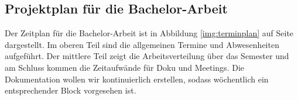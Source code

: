 
\subsection{Projektplan für die Bachelor-Arbeit}
Der Zeitplan für die Bachelor-Arbeit ist in Abbildung \ref{img:terminplan} auf Seite \pageref{img:terminplan} dargestellt.
Im oberen Teil sind die allgemeinen Termine und Abwesenheiten aufgeführt. Der mittlere Teil zeigt die Arbeitsverteilung über das Semester und am Schluss kommen die Zeitaufwände für Doku und Meetings. Die Dokumentation wollen wir kontinuierlich erstellen, sodass wöchentlich ein entsprechender Block vorgesehen ist.





